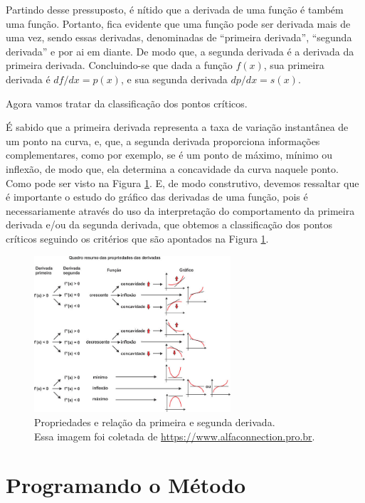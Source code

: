 Partindo desse pressuposto, é nítido que a derivada de uma função é também uma
função. Portanto, fica evidente que uma função pode ser derivada
mais de uma vez, sendo essas derivadas, denominadas de ``primeira derivada'',
``segunda derivada'' e por ai em diante. De modo que, a segunda derivada é
a derivada da primeira derivada. Concluindo-se que dada a função
\(f(x)\), sua primeira derivada é \(df/dx = p(x)\), e sua segunda derivada
\(dp/dx = s(x)\).

Agora vamos tratar da classificação dos pontos críticos.

É sabido que a primeira derivada representa a taxa de variação instantânea de
um ponto na curva, e, que, a segunda derivada proporciona informações
complementares, como por exemplo, se é um ponto de máximo, mínimo ou inflexão,
de modo que, ela determina a concavidade da curva naquele ponto. Como pode ser
visto na Figura \ref{relacao_primeira_segunda_derivada}. E, de modo construtivo,
devemos ressaltar que é importante o estudo do gráfico das derivadas de uma
função, pois é necessariamente através do uso da interpretação do comportamento
da primeira derivada e/ou da segunda derivada, que obtemos a classificação dos
pontos críticos seguindo os critérios que são apontados na Figura \ref{relacao_primeira_segunda_derivada}.

\begin{figure}[h]
    \centering
    \includegraphics[width=0.65\textwidth]{src/relacao_primeira_segunda_derivada.jpg}
    \captionsetup{justification=centering}
    \caption{
        Propriedades e relação da primeira e segunda derivada.\\
        \tiny Essa imagem foi coletada de \url{https://www.alfaconnection.pro.br}.
    }
    \label{relacao_primeira_segunda_derivada}
\end{figure}


\section{{Programando o Método}}

